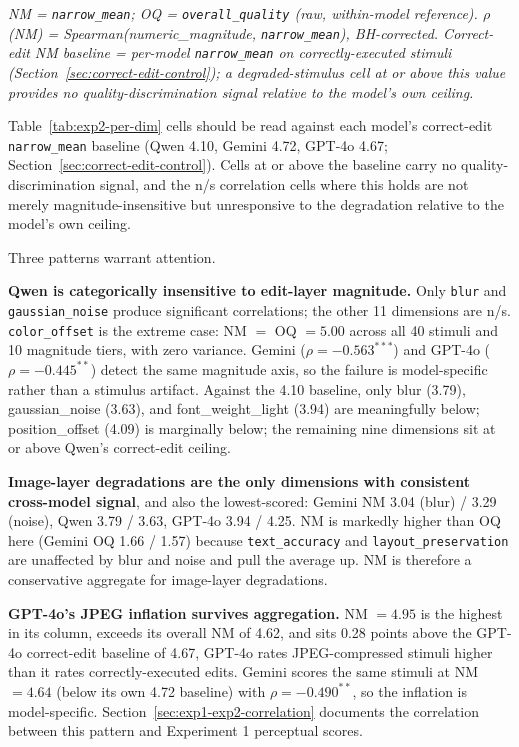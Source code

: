\begin{table}[htbp]
\smallskip
\footnotesize\textit{NM = \texttt{narrow\_mean}; OQ = \texttt{overall\_quality} (raw, within-model reference). $\rho$ (NM) = Spearman(numeric\_magnitude, \texttt{narrow\_mean}), BH-corrected. Correct-edit NM baseline = per-model \texttt{narrow\_mean} on correctly-executed stimuli (Section~\ref{sec:correct-edit-control}); a degraded-stimulus cell at or above this value provides no quality-discrimination signal relative to the model's own ceiling.}
\end{table}

Table~\ref{tab:exp2-per-dim} cells should be read against each model's correct-edit \texttt{narrow\_mean} baseline (Qwen 4.10, Gemini 4.72, GPT-4o 4.67; Section~\ref{sec:correct-edit-control}). Cells at or above the baseline carry no quality-discrimination signal, and the n/s correlation cells where this holds are not merely magnitude-insensitive but unresponsive to the degradation relative to the model's own ceiling.

Three patterns warrant attention.

\textbf{Qwen is categorically insensitive to edit-layer magnitude.} Only \texttt{blur} and \texttt{gaussian\_noise} produce significant correlations; the other 11 dimensions are n/s. \texttt{color\_offset} is the extreme case: NM $=$ OQ $= 5.00$ across all 40 stimuli and 10 magnitude tiers, with zero variance. Gemini ($\rho = -0.563^{***}$) and GPT-4o ($\rho = -0.445^{**}$) detect the same magnitude axis, so the failure is model-specific rather than a stimulus artifact. Against the 4.10 baseline, only blur (3.79), gaussian\_noise (3.63), and font\_weight\_light (3.94) are meaningfully below; position\_offset (4.09) is marginally below; the remaining nine dimensions sit at or above Qwen's correct-edit ceiling.

\textbf{Image-layer degradations are the only dimensions with consistent cross-model signal}, and also the lowest-scored: Gemini NM 3.04 (blur) / 3.29 (noise), Qwen 3.79 / 3.63, GPT-4o 3.94 / 4.25. NM is markedly higher than OQ here (Gemini OQ 1.66 / 1.57) because \texttt{text\_accuracy} and \texttt{layout\_preservation} are unaffected by blur and noise and pull the average up. NM is therefore a conservative aggregate for image-layer degradations.

\textbf{GPT-4o's JPEG inflation survives aggregation.} NM $= 4.95$ is the highest in its column, exceeds its overall NM of 4.62, and sits 0.28 points above the GPT-4o correct-edit baseline of 4.67, GPT-4o rates JPEG-compressed stimuli higher than it rates correctly-executed edits. Gemini scores the same stimuli at NM $= 4.64$ (below its own 4.72 baseline) with $\rho = -0.490^{**}$, so the inflation is model-specific. Section~\ref{sec:exp1-exp2-correlation} documents the correlation between this pattern and Experiment 1 perceptual scores.


